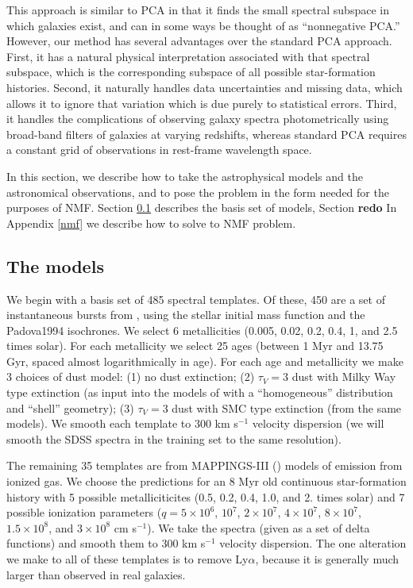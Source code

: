 \documentclass[10pt,preprint]{aastex}
\begin{document}
This approach is similar to PCA in that it finds the small spectral
subspace in which galaxies exist, and can in some ways be thought of
as ``nonnegative PCA.''  However, our method has several advantages
over the standard PCA approach. First, it has a natural physical
interpretation associated with that spectral subspace, which is the
corresponding subspace of all possible star-formation
histories. Second, it naturally handles data uncertainties and missing
data, which allows it to ignore that variation which is due purely to
statistical errors.  Third, it handles the complications of observing
galaxy spectra photometrically using broad-band filters of galaxies at
varying redshifts, whereas standard PCA requires a constant grid of
observations in rest-frame wavelength space.

In this section, we describe how to take the astrophysical models and
the astronomical observations, and to pose the problem in the form
needed for the purposes of NMF. Section \ref{models} describes the
basis set of models, Section {\bf redo} In Appendix \ref{nmf} we describe
how to solve to NMF problem.

\subsection{The models}
\label{models}

We begin with a basis set of 485 spectral templates. Of these, 450 are
a set of instantaneous bursts from \citet{bruzual03a}, using the
\citet{chabrier03a} stellar initial mass function and the Padova1994
isochrones. We select 6 metallicities (0.005, 0.02, 0.2, 0.4, 1, and
2.5 times solar). For each metallicity we select 25 ages (between 1
Myr and 13.75 Gyr, spaced almost logarithmically in age).  For each
age and metallicity we make 3 choices of dust model: (1) no dust
extinction; (2) $\tau_V = 3$ dust with Milky Way type extinction (as
input into the models of
\citealt{witt00a} with a ``homogeneous'' distribution and ``shell''
geometry); (3) $\tau_V = 3$ dust with SMC type extinction (from the
same models). We smooth each template to $300$ km s$^{-1}$ velocity
dispersion (we will smooth the SDSS spectra in the training set to the
same resolution). 

The remaining 35 templates are from MAPPINGS-III (\citealt{kewley01a})
models of emission from ionized gas. We choose the predictions for an
8 Myr old continuous star-formation history with 5 possible
metalliciticites (0.5, 0.2, 0.4, 1.0, and 2. times solar) and 7
possible ionization parameters ($q= 5\times 10^6$, $10^7$, $2\times
10^7$, $4\times 10^7$, $8 \times 10^7$, $1.5\times 10^8$, and $3\times
10^8$ cm s$^{-1}$). We take the spectra (given as a set of delta
functions) and smooth them to $300$ km s$^{-1}$ velocity
dispersion. The one alteration we make to all of these templates is to
remove Ly$\alpha$, because it is generally much larger than observed
in real galaxies.
\end{document}

